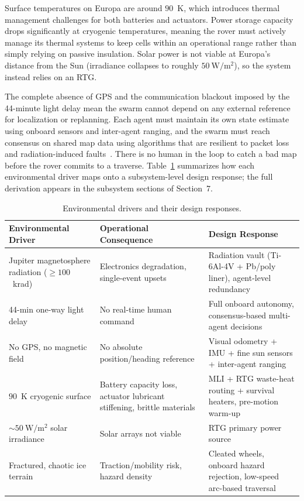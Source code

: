 \documentclass[11pt]{article}
\begin{document}
Surface temperatures on Europa are around $90$~K, which introduces thermal management challenges
for both batteries and actuators. Power storage capacity drops significantly at cryogenic
temperatures, meaning the rover must actively manage its thermal systems to keep cells within an
operational range rather than simply relying on passive insulation. Solar power is not viable at
Europa's distance from the Sun (irradiance collapses to roughly $50\ \mathrm{W/m^2}$), so the
system instead relies on an RTG.

The complete absence of GPS and the communication blackout imposed by the 44-minute light delay
mean the swarm cannot depend on any external reference for localization or replanning. Each agent
must maintain its own state estimate using onboard sensors and inter-agent ranging, and the swarm
must reach consensus on shared map data using algorithms that are resilient to packet loss and
radiation-induced faults~\cite{stmdShortfall,nasaSBIR}. There is no human in the loop to catch a
bad map before the rover commits to a traverse. Table~\ref{tab:env-drivers} summarizes how each
environmental driver maps onto a subsystem-level design response; the full derivation appears in
the subsystem sections of Section~7.

\begin{table}[H]
\centering
\small
\begin{tabular}{p{4cm}p{4.5cm}p{5.5cm}}
\toprule
\textbf{Environmental Driver} & \textbf{Operational Consequence} & \textbf{Design Response} \\
\midrule
Jupiter magnetosphere radiation ($\geq 100$~krad) & Electronics degradation, single-event upsets & Radiation vault (Ti-6Al-4V + Pb/poly liner), agent-level redundancy \\
44-min one-way light delay & No real-time human command & Full onboard autonomy, consensus-based multi-agent decisions \\
No GPS, no magnetic field & No absolute position/heading reference & Visual odometry + IMU + fine sun sensors + inter-agent ranging \\
$90$~K cryogenic surface & Battery capacity loss, actuator lubricant stiffening, brittle materials & MLI + RTG waste-heat routing + survival heaters, pre-motion warm-up \\
$\sim 50\ \mathrm{W/m^2}$ solar irradiance & Solar arrays not viable & RTG primary power source \\
Fractured, chaotic ice terrain & Traction/mobility risk, hazard density & Cleated wheels, onboard hazard rejection, low-speed arc-based traversal \\
\bottomrule
\end{tabular}
\caption{Environmental drivers and their design responses.}
\label{tab:env-drivers}
\end{table}
\end{document}

